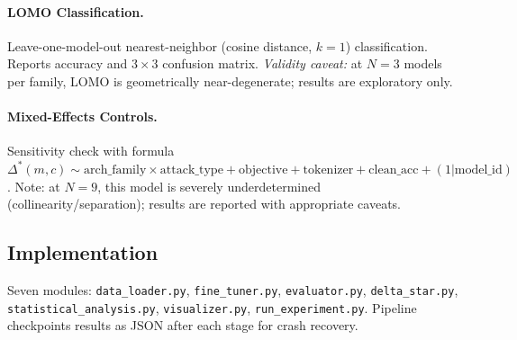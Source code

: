 \paragraph{LOMO Classification.}
Leave-one-model-out nearest-neighbor (cosine distance, $k=1$) classification. Reports accuracy
and $3 \times 3$ confusion matrix. \emph{Validity caveat:} at $N=3$ models per family, LOMO is
geometrically near-degenerate; results are exploratory only.

\paragraph{Mixed-Effects Controls.}
Sensitivity check with formula
$\Delta^*(m,c) \sim \text{arch\_family} \times \text{attack\_type} + \text{objective} +
\text{tokenizer} + \text{clean\_acc} + (1|\text{model\_id})$.
Note: at $N=9$, this model is severely underdetermined (collinearity/separation); results are
reported with appropriate caveats.

\subsection{Implementation}

Seven modules: \texttt{data\_loader.py}, \texttt{fine\_tuner.py}, \texttt{evaluator.py},
\texttt{delta\_star.py}, \texttt{statistical\_analysis.py}, \texttt{visualizer.py},
\texttt{run\_experiment.py}. Pipeline checkpoints results as JSON after each stage for crash
recovery.

